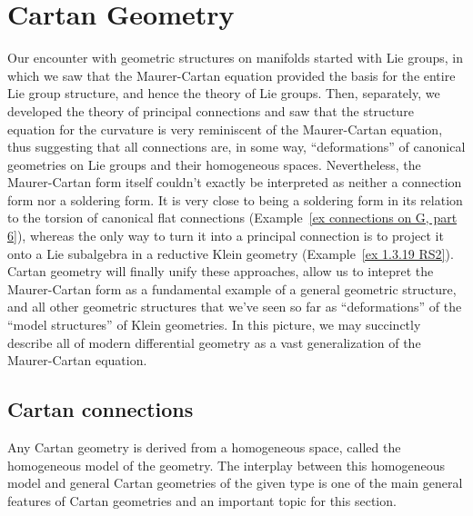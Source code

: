 \chapter{Cartan Geometry}\label{ch: cartan geom}


Our encounter with geometric structures on manifolds started with Lie groups, in which we saw that the Maurer-Cartan equation provided the basis for the entire Lie group structure, and hence the theory of Lie groups. Then, separately, we developed the theory of principal connections and saw that the structure equation for the curvature is very reminiscent of the Maurer-Cartan equation, thus suggesting that all connections are, in some way, ``deformations'' of canonical geometries on Lie groups and their homogeneous spaces. Nevertheless, the Maurer-Cartan form itself couldn't exactly be interpreted as neither a connection form nor a soldering form. It is very close to being a soldering form in its relation to the torsion of canonical flat connections (Example~\ref{ex connections on G, part 6}), whereas the only way to turn it into a principal connection is to project it onto a Lie subalgebra in a reductive Klein geometry (Example~\ref{ex 1.3.19 RS2}). Cartan geometry will finally unify these approaches, allow us to intepret the Maurer-Cartan form as a fundamental example of a general geometric structure, and all other geometric structures that we've seen so far as ``deformations'' of the ``model structures'' of Klein geometries. In this picture, we may succinctly describe all of modern differential geometry as a vast generalization of the Maurer-Cartan equation.






\section{Cartan connections}

Any Cartan geometry is derived from a homogeneous space, called the homogeneous model of the geometry. The interplay between this homogeneous model and general Cartan geometries of the given type is one of the main general features of Cartan geometries and an important topic for this section.



